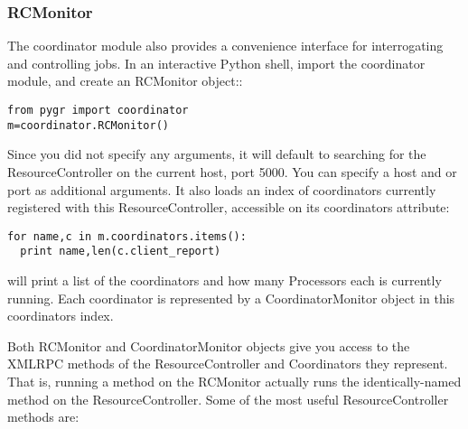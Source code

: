 \documentclass{howto}
\begin{document}
\subsubsection{RCMonitor}

The coordinator module also provides a convenience interface for interrogating and controlling jobs.  In an interactive Python shell, import the coordinator module, and create an RCMonitor object::

\begin{verbatim}
from pygr import coordinator
m=coordinator.RCMonitor()
\end{verbatim}

Since you did not specify any arguments, it will default to searching for the ResourceController on the current host, port 5000.  You can specify a host and or port as additional arguments.  It also loads an index of coordinators currently registered with this ResourceController, accessible on its coordinators attribute:

\begin{verbatim}
for name,c in m.coordinators.items():
  print name,len(c.client_report)
\end{verbatim}

will print a list of the coordinators and how many Processors each is currently running.  Each coordinator is represented by a CoordinatorMonitor object in this coordinators index.

Both RCMonitor and CoordinatorMonitor objects give you access to the XMLRPC methods of the ResourceController and Coordinators they represent.  That is, running a method on the RCMonitor actually runs the identically-named method on the ResourceController.  Some of the most useful ResourceController methods are:
\end{document}
